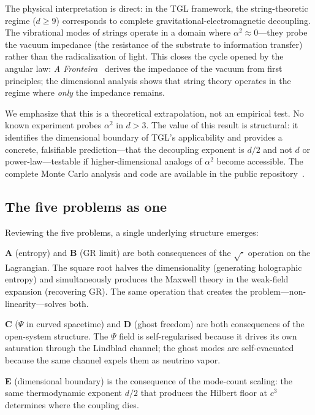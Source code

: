 \documentclass[12pt,a4paper,twocolumn]{article}
\begin{document}
The physical interpretation is direct: in the TGL framework, the string-theoretic regime ($d \geq 9$) corresponds to complete gravitational-electromagnetic decoupling. The vibrational modes of strings operate in a domain where $\alpha^2 \approx 0$---they probe the vacuum impedance (the resistance of the substrate to information transfer) rather than the radicalization of light. This closes the cycle opened by the angular law: \emph{A Fronteira}~\cite{Miguel2026Fronteira} derives the impedance of the vacuum from first principles; the dimensional analysis shows that string theory operates in the regime where \emph{only} the impedance remains.

We emphasize that this is a theoretical extrapolation, not an empirical test. No known experiment probes $\alpha^2$ in $d > 3$. The value of this result is structural: it identifies the dimensional boundary of TGL's applicability and provides a concrete, falsifiable prediction---that the decoupling exponent is $d/2$ and not $d$ or power-law---testable if higher-dimensional analogs of $\alpha^2$ become accessible. The complete Monte Carlo analysis and code are available in the public repository~\cite{Miguel2026GitHub,Miguel2026DimCoupling}.


\subsection{The five problems as one}
\label{sec:four_as_one}

Reviewing the five problems, a single underlying structure emerges:

\textbf{A} (entropy) and \textbf{B} (GR limit) are both consequences of the 
$\sqrt{\cdot}$ operation on the Lagrangian. The square root halves the 
dimensionality (generating holographic entropy) and simultaneously produces 
the Maxwell theory in the weak-field expansion (recovering GR). The same 
operation that creates the problem---non-linearity---solves both.

\textbf{C} ($\Psi$ in curved spacetime) and \textbf{D} (ghost freedom) are 
both consequences of the open-system structure. The $\Psi$ field is 
self-regularised because it drives its own saturation through the Lindblad 
channel; the ghost modes are self-evacuated because the same channel expels 
them as neutrino vapor.

\textbf{E} (dimensional boundary) is the consequence of the mode-count scaling: the same thermodynamic exponent $d/2$ that produces the Hilbert floor at $c^3$ determines where the coupling dies.
\end{document}
